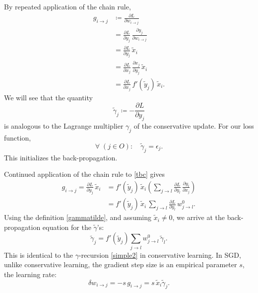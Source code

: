 \documentclass[12pt]{article}
\begin{document}
By repeated application of the chain rule,
\begin{subequations}
\begin{align}
g_{i\to j}&\coloneqq \frac{\partial L}{\partial w_{i\to j}}\\
&=\frac{\partial L}{\partial  y_j}\,\frac{\partial y_j}{\partial w_{i\to j}}\\
&=\frac{\partial L}{\partial  y_j}\,\tilde{x}_i\label{chain1}\\
&=\frac{\partial L}{\partial  x_j}\,\frac{\partial x_j}{\partial y_j}\,\tilde{x}_i\\
&=\frac{\partial L}{\partial  x_j}\,f'(\tilde{y}_j)\,\tilde{x}_i\label{tbc}.
\end{align}
\end{subequations}
We will see that the quantity
\begin{equation}\label{gammatilde}
\widetilde{\gamma}_j\coloneqq-\frac{\partial L}{\partial  y_j}
\end{equation}
is analogous to the Lagrange multiplier $\gamma_j$ of the conservative update. 
For our loss function,
\begin{equation}
\forall\; (j\in O):\quad \widetilde{\gamma}_j=\epsilon_j.
\end{equation}
This initializes the back-propagation.

Continued application of the chain rule to \eqref{tbc} gives
\begin{align}
g_{i\to j}=\frac{\partial L}{\partial  y_j}\,\tilde{x}_i&=f'(\tilde{y}_j)\,\tilde{x}_i\left(\sum_{j\to l}\frac{\partial L}{\partial  y_l}\,\frac{\partial y_l}{\partial  x_j}\right)\\
&=f'(\tilde{y}_j)\,\tilde{x}_i\,\sum_{j\to l}\frac{\partial L}{\partial  y_l}\,w^0_{j\to l}.
\end{align}
Using the definition \eqref{gammatilde}, and assuming $\tilde{x}_i\ne 0$, we arrive at the back-propagation equation for the $\widetilde{\gamma}$'s:
\begin{equation}
\widetilde{\gamma}_j=f'(\tilde{y}_j)\sum_{j\to l}w^0_{j\to l}\,\widetilde{\gamma}_l.
\end{equation}
This is identical to the $\gamma$-recursion \eqref{simple2} in conservative learning. In SGD, unlike conservative learning, the gradient step size is an empirical parameter $s$, the learning rate:
\begin{equation}
\delta w_{i\to j}=-s\, g_{i\to j}=s\, \tilde{x}_i \widetilde{\gamma}_j.
\end{equation}
\end{document}
